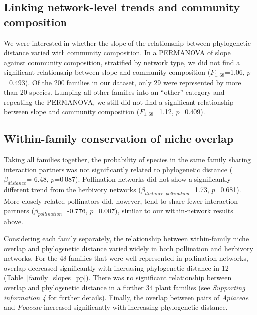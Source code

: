 \documentclass[12pt]{article}
\begin{document}
\begin{spacing}{1.5}
  \subsection*{Linking network-level trends and community composition} 

    We were interested in whether the slope of the relationship between phylogenetic distance varied with community composition. In a PERMANOVA of slope against community composition, stratified by network type, we did not find a significant relationship between slope and community composition ($F_{1,68}$=1.06, $p$=0.493). Of the 200 families in our dataset, only 29 were represented by more than 20 species. Lumping all other families into an ``other'' category and repeating the PERMANOVA, we still did not find a significant relationship between slope and community composition ($F_{1,68}$=1.12, $p$=0.409). 


  \subsection*{Within-family conservation of niche overlap} 

    Taking all families together, the probability of species in the same family sharing interaction partners was not significantly related to phylogenetic distance ($\beta_{distance}$=-6.48, $p$=0.087). Pollination networks did not show a significantly different trend from the herbivory networks ($\beta_{distance:pollination}$=1.73, $p$=0.681). More closely-related pollinators did, however, tend to share fewer interaction partners ($\beta_{pollination}$=-0.776, $p$=0.007), similar to our within-network results above.


    Considering each family separately, the relationship between within-family niche overlap and phylogenetic distance varied widely in both pollination and herbivory networks. 
    For the 48 families that were well represented in pollination networks, overlap decreased significantly with increasing phylogenetic distance in 12 (Table~\ref{family_slopes_pp}).
    There was no significant relationship between overlap and phylogenetic distance in
    a further 34 plant families (see \emph{Supporting information 4} for further 
    details). Finally, the overlap between pairs of \emph{Apiaceae} and \emph{Poaceae} increased significantly with increasing phylogenetic distance.



\end{spacing}
\end{document}
